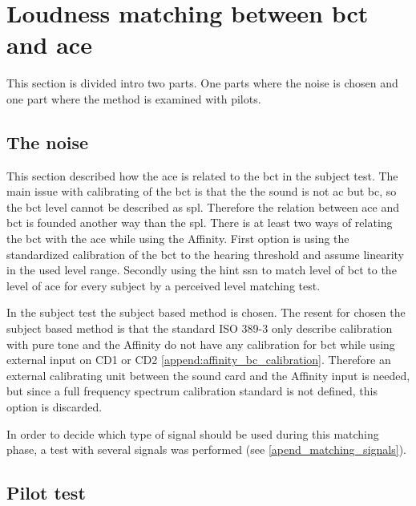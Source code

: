 
\section{Loudness matching between \gls{bct} and \gls{ace}}

\label{sec:loudness_match}
This section is divided intro two parts. One parts where the noise is chosen and one part where the method is examined with pilots.


\subsection{The noise}
This section described how the \gls{ace} is related to the \gls{bct} in the subject test. The main issue with calibrating of the \gls{bct} is that the the sound is not \gls{ac} but \gls{bc}, so the \gls{bct} level cannot be described as \gls{spl}. Therefore the relation between \gls{ace} and \gls{bct} is founded another way than the \gls{spl}. There is at least two ways of relating the \gls{bct} with the \gls{ace} while using the Affinity. First option is using the standardized calibration of the \gls{bct} to the hearing threshold and assume linearity in the used level range. Secondly using the \gls{hint} \gls{ssn} \citep{nilsson_95} to match level of \gls{bct} to the level of \gls{ace} for every subject by a perceived level matching test.

In the subject test the subject based method is chosen. The resent for chosen the subject based method is that the standard ISO 389-3 \citep{iso_389-3} only describe calibration with pure tone and the Affinity do not have any calibration for \gls{bct} while using external input on CD1 or CD2 \autoref{append:affinity_bc_calibration}. Therefore an external calibrating unit between the sound card and the Affinity input is needed, but since a full frequency spectrum calibration standard is not defined, this option is discarded.

In order to decide which type of signal should be used during this matching phase, a test with several signals was performed 
(see \autoref{apend_matching_signals}).


\subsection{Pilot test}



